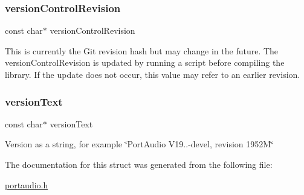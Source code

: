 \subsubsection{\texorpdfstring{version\+Control\+Revision}{versionControlRevision}}
{\footnotesize\ttfamily const char$\ast$ version\+Control\+Revision}

This is currently the Git revision hash but may change in the future. The version\+Control\+Revision is updated by running a script before compiling the library. If the update does not occur, this value may refer to an earlier revision. \mbox{\label{struct_pa_version_info_a0364a83bb08835d1d044611a4bda5477}} 
\subsubsection{\texorpdfstring{version\+Text}{versionText}}
{\footnotesize\ttfamily const char$\ast$ version\+Text}

Version as a string, for example \char`\"{}\+Port\+Audio V19..-\/devel, revision 1952\+M\char`\"{} 

The documentation for this struct was generated from the following file\+:\begin{DoxyCompactItemize}
\item 
\hyperlink{portaudio_8h}{portaudio.\+h}\end{DoxyCompactItemize}
